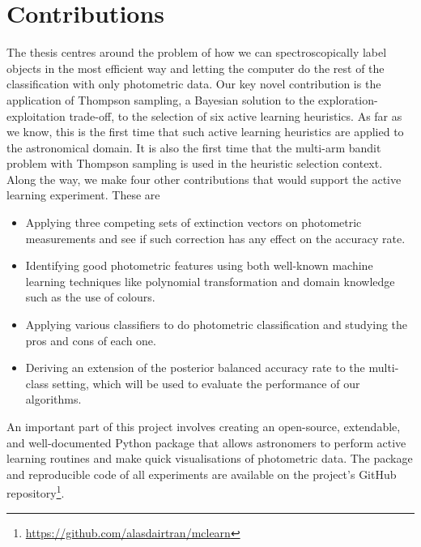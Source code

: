 \section{Contributions}
\label{sec:contributions}
The thesis centres around the problem of how we can spectroscopically label objects in
the most efficient way and letting the computer do the rest of the classification with only
photometric data. Our key novel contribution is the application of Thompson sampling,
a Bayesian solution to the exploration-exploitation trade-off, to the selection of six
active learning heuristics. As far as we know, this is the first time that such active learning
heuristics are applied to the astronomical domain. It is also the first time that the
multi-arm bandit problem with Thompson sampling is used in the heuristic selection context.
Along the way, we make four other contributions that would support the active learning
experiment. These are
	\begin{itemize}
		\item Applying three competing sets of extinction
		vectors on photometric measurements and see if such correction has any effect on the accuracy rate.
		\item Identifying good photometric features using both well-known machine learning techniques
		like polynomial transformation and domain knowledge such as the use of colours.
		\item Applying various classifiers to do photometric classification and studying the
		pros and cons of each one.
		\item Deriving an extension of the
		posterior balanced accuracy rate to the multi-class setting, which will be used to evaluate
		the performance of our algorithms.
	\end{itemize}
An important part of this project involves creating an
open-source, extendable, and well-documented Python package that allows astronomers to perform active learning
routines and make quick visualisations of photometric data. The package and
reproducible code of all experiments are available on the project's GitHub repository\footnote{
	\url{https://github.com/alasdairtran/mclearn}}.


